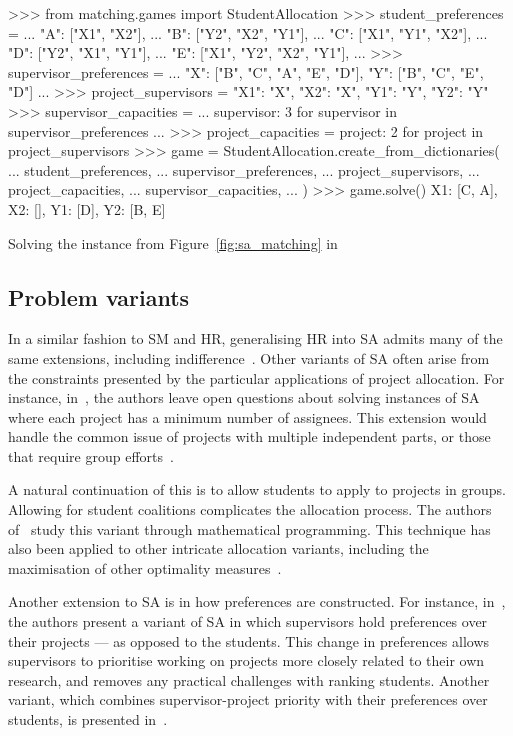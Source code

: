 \begin{listing}[htbp]
\begin{usagepy}
>>> from matching.games import StudentAllocation
>>> student_preferences = {
...     "A": ["X1", "X2"],
...     "B": ["Y2", "X2", "Y1"],
...     "C": ["X1", "Y1", "X2"],
...     "D": ["Y2", "X1", "Y1"],
...     "E": ["X1", "Y2", "X2", "Y1"],
... }
>>> supervisor_preferences = {
...     "X": ["B", "C", "A", "E", "D"], "Y": ["B", "C", "E", "D"]
... }
>>> project_supervisors = {"X1": "X", "X2": "X", "Y1": "Y", "Y2": "Y"}
>>> supervisor_capacities = {
...     supervisor: 3 for supervisor in supervisor_preferences
... }
>>> project_capacities = {project: 2 for project in project_supervisors}
>>> game = StudentAllocation.create_from_dictionaries(
...     student_preferences,
...     supervisor_preferences,
...     project_supervisors,
...     project_capacities,
...     supervisor_capacities,
... )
>>> game.solve()
{X1: [C, A], X2: [], Y1: [D], Y2: [B, E]}

\end{usagepy}
\caption{Solving the instance from Figure~\ref{fig:sa_matching} in \matching}
\label{snp:student_optimal}
\end{listing}


\subsection{Problem variants}

In a similar fashion to SM and HR, generalising HR into SA admits many of the
same extensions, including indifference~\cite{Olaosebikan2020}. Other variants
of SA often arise from the constraints presented by the particular applications
of project allocation. For instance, in~\cite{Abraham2007}, the authors leave
open questions about solving instances of SA where each project has a minimum
number of assignees. This extension would handle the common issue of projects
with multiple independent parts, or those that require group
efforts~\cite{Arulselvan2016}.

A natural continuation of this is to allow students to apply to projects in
groups. Allowing for student coalitions complicates the allocation process.
The authors of~\cite{Chiarandini2017} study this variant through mathematical
programming. This technique has also been applied to other intricate allocation
variants, including the maximisation of other optimality
measures~\cite{Kwanashie2015}.

Another extension to SA is in how preferences are constructed. For instance,
in~\cite{Manlove2008}, the authors present a variant of SA in which supervisors
hold preferences over their projects --- as opposed to the students. This change
in preferences allows supervisors to prioritise working on projects more closely
related to their own research, and removes any practical challenges with ranking
students. Another variant, which combines supervisor-project priority with their
preferences over students, is presented in~\cite{ElAtta2009}.
